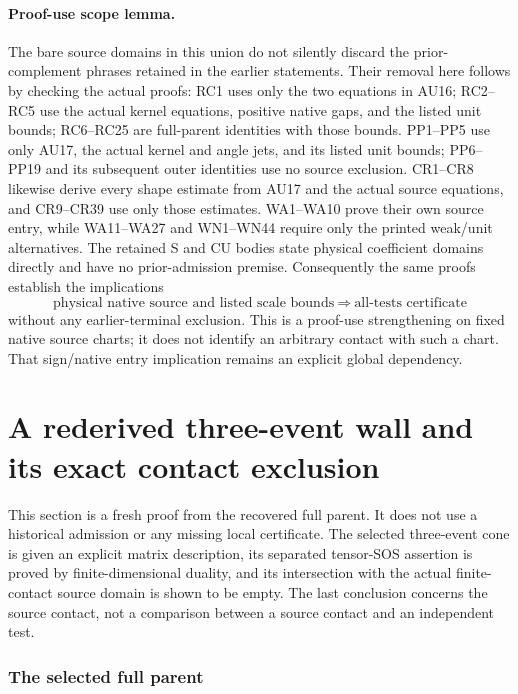 \paragraph{Proof-use scope lemma.}
The bare source domains in this union do not silently discard
the prior-complement phrases retained in the earlier statements.
Their removal here follows by checking the actual proofs:
RC1 uses only the two equations in AU16; RC2--RC5 use the actual
kernel equations, positive native gaps, and the listed unit bounds;
RC6--RC25 are full-parent identities with those bounds.
PP1--PP5 use only AU17, the actual kernel and angle jets, and its
listed unit bounds; PP6--PP19 and its subsequent outer identities
use no source exclusion.
CR1--CR8 likewise derive every shape estimate from AU17 and the
actual source equations, and CR9--CR39 use only those estimates.
WA1--WA10 prove their own source entry, while WA11--WA27 and
WN1--WN44 require only the printed weak/unit alternatives.
The retained S and CU bodies state physical coefficient domains
directly and have no prior-admission premise.
Consequently the same proofs establish the implications
\[
 \text{physical native source and listed scale bounds}
 \ \Longrightarrow\ \text{all-tests certificate}
 \tag{AU19}
\]
without any earlier-terminal exclusion.
This is a proof-use strengthening on fixed native source charts;
it does not identify an arbitrary contact with such a chart.
That sign/native entry implication remains an explicit global
dependency.



\section{\texorpdfstring{A rederived three-event wall and its exact contact exclusion}{A rederived three-event wall and its exact contact exclusion}}
\label{component:p23a094ff816d}

\label{p23a094ff816d:sec:rederived-three-event-contact}

This section is a fresh proof from the recovered full parent.  It does
not use a historical admission or any missing local certificate.  The
selected three-event cone is given an explicit matrix description, its
separated tensor-SOS assertion is proved by finite-dimensional duality,
and its intersection with the actual finite-contact source domain is
shown to be empty.  The last conclusion concerns the source contact,
not a comparison between a source contact and an independent test.

\subsubsection*{The selected full parent}

